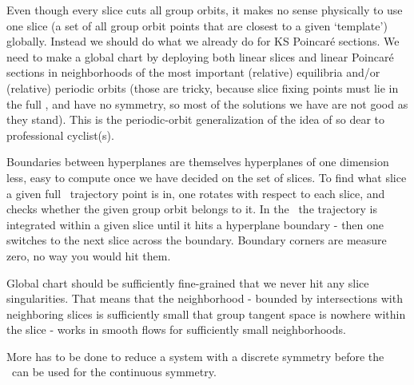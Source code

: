 Even though every slice cuts all group orbits, it makes no sense physically to
use one slice
(a set of all group orbit points that are closest to a given `template')
globally. Instead we should do what we already do for KS Poincar\'e sections.
We need to make a global chart by deploying both linear slices and linear
Poincar\'e sections in neighborhoods of the most important (relative)
equilibria and/or (relative) periodic orbits (those are tricky, because
slice fixing points must lie in the full \statesp, and have no symmetry,
so most of the solutions we have are not good as they stand). This is the
periodic-orbit generalization of the idea of
so dear to professional cyclist(s).


Boundaries
between hyperplanes are themselves hyperplanes of one dimension less,
easy to compute once we have decided on the set of slices. To find
what slice a given full \statesp\ trajectory point is in, one rotates
with respect to each slice, and checks whether the given group orbit
belongs to it. In the \reducedsp\ the trajectory is integrated within a
given slice until it hits a hyperplane boundary - then one switches to
the next slice across the boundary. Boundary corners are measure zero, no
way you would hit them.

Global chart should be sufficiently fine-grained that we never hit any
slice singularities. That means that the neighborhood - bounded by
intersections with neighboring slices is sufficiently small that group
tangent space is nowhere within the slice - works in smooth flows
for sufficiently small neighborhoods.


More has to be done to reduce a system with a discrete
symmetry before the \mslices\ can be used for the continuous symmetry.

